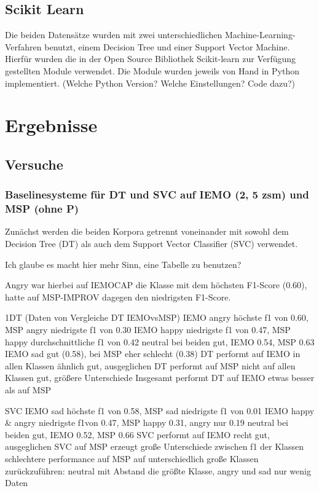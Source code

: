 \documentclass{article} %
\begin{document}
\subsection{Scikit Learn}

Die beiden Datensätze wurden mit zwei unterschiedlichen Machine-Learning-Verfahren benutzt, einem Decision Tree und einer Support Vector Machine. Hierfür wurden die in der Open Source Bibliothek Scikit-learn zur Verfügung gestellten Module verwendet. Die Module wurden jeweils von Hand in Python implementiert. 
(Welche Python Version? Welche Einstellungen? Code dazu?)

\section{Ergebnisse}

\subsection{Versuche}

\subsubsection{Baselinesysteme für DT und SVC auf IEMO (2, 5 zsm) und MSP (ohne P)}

Zunächst werden die beiden Korpora getrennt voneinander mit sowohl dem Decision Tree (DT) als auch dem Support Vector Classifier (SVC) verwendet. 


Ich glaube es macht hier mehr Sinn, eine Tabelle zu benutzen?


Angry war hierbei auf IEMOCAP die Klasse mit dem höchsten F1-Score (0.60), hatte auf MSP-IMPROV dagegen den niedrigsten F1-Score. 

1DT (Daten von Vergleiche DT IEMOvsMSP)
IEMO angry höchste f1 von 0.60, MSP angry niedrigste f1 von 0.30
IEMO happy niedrigste f1 von 0.47, MSP happy durchschnittliche f1 von 0.42
neutral bei beiden gut, IEMO 0.54, MSP 0.63
IEMO sad gut (0.58), bei MSP eher schlecht (0.38)
DT performt auf IEMO in allen Klassen ähnlich gut, ausgeglichen
DT performt auf MSP nicht auf allen Klassen gut, größere Unterschiede
Insgesamt performt DT auf IEMO etwas besser als auf MSP

SVC
IEMO sad höchste f1 von 0.58, MSP sad niedrigste f1 von 0.01
IEMO happy \& angry niedrigste f1von 0.47, MSP happy 0.31, angry nur 0.19
neutral bei beiden gut, IEMO 0.52, MSP 0.66
SVC performt auf IEMO recht gut, ausgeglichen
SVC auf MSP erzeugt große Unterschiede zwischen f1 der Klassen
schlechtere performance auf MSP auf unterschiedlich große Klassen zurückzuführen: neutral mit Abstand die größte Klasse, angry und sad nur wenig Daten
\end{document}
